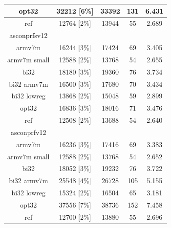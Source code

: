 \documentclass[12pt,a4paper,italian]{report}
\begin{document}
\begin{table}[h]
\begin{tabular}{|c|c|c|c|c|}
        \hline
        opt32 & 32212 [6\%] & 33392 & 131 & 6.431 \\
        \hline
        ref & 12764 [2\%] & 13944 & 55 & 2.689 \\
        \hline
        asconprfsv12 & & & & \\
        \hline
        armv7m & 16244 [3\%] & 17424 & 69 & 3.405 \\
        \hline
        armv7m small & 12588 [2\%] & 13768 & 54 & 2.655 \\
        \hline
        bi32 & 18180 [3\%] & 19360 & 76 & 3.734 \\ 
        \hline
        bi32 armv7m & 16500 [3\%] & 17680 & 70 & 3.434 \\
        \hline
        bi32 lowreg & 13868 [2\%] & 15048 & 59 & 2.899 \\
        \hline
        opt32 & 16836 [3\%] & 18016 & 71 & 3.476 \\
        \hline
        ref & 12508 [2\%] & 13688 & 54 & 2.640 \\
        \hline
        asconprfv12 & & & & \\
        \hline
        armv7m & 16236 [3\%] & 17416 & 69 & 3.383 \\
        \hline
        armv7m small & 12588 [2\%] & 13768 & 54 & 2.652 \\
        \hline
        bi32 & 18052 [3\%] & 19232 & 76 & 3.722 \\ 
        \hline
        bi32 armv7m & 25548 [4\%] & 26728 & 105 & 5.155 \\
        \hline
        bi32 lowreg & 15324 [2\%] & 16504 & 65 & 3.181 \\
        \hline
        opt32 & 37556 [7\%] & 38736 & 152 & 7.458 \\
        \hline
        ref & 12700 [2\%] & 13880 & 55 & 2.696 \\
        \hline
    \end{tabular}
\end{table}
\end{document}
